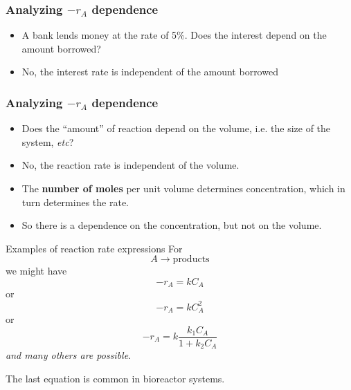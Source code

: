 \begin{frame}\frametitle{Analyzing $-r_A$ dependence}
	\begin{itemize}
		\item	 A bank lends money at the rate of 5\%. Does the interest depend on the amount borrowed?
		\item	 No, the interest rate is independent of the amount borrowed
	\end{itemize}
\end{frame}

\begin{frame}\frametitle{Analyzing $-r_A$ dependence}
	\begin{itemize}
		\item	Does the ``amount'' of reaction depend on the volume, i.e. the size of the system, \emph{etc}?
		\item	No, the reaction rate is independent of the volume.
		\item	The \textbf{number of moles} per unit volume determines concentration, which in turn determines the rate.
		\item	So there is a dependence on the concentration, but not on the volume.
	\end{itemize}
\end{frame}


\begin{frame}{Examples of reaction rate expressions}
	For $$A\longrightarrow\text{products}$$ we might have
	$$-r_A = kC_A$$ or
	$$-r_A = kC_A^2$$ or
	$$-r_A = k\frac{k_1C_A}{1 + k_2C_A}$$
	\emph{and many others are possible}.

	\vspace{12pt}
	The last equation is common in bioreactor systems.
\end{frame}


